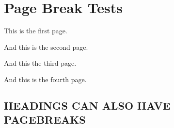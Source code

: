 \section{ Page Break Tests }\label{page-break-tests}

This is the first page.

\clearpage{}

And this is the second page.

\clearpage{}

And this the third page.

\clearpage{}

\clearpage{}

And this is the fourth page.

\clearpage{}

\subsection[ HEADINGS CAN ALSO HAVE PAGEBREAKS
]{\texorpdfstring{\protect\hypertarget{h.io8kap65ol11}{}{} HEADINGS CAN
ALSO HAVE PAGEBREAKS
}{ HEADINGS CAN ALSO HAVE PAGEBREAKS }}\label{headings-can-also-have-pagebreaks}
